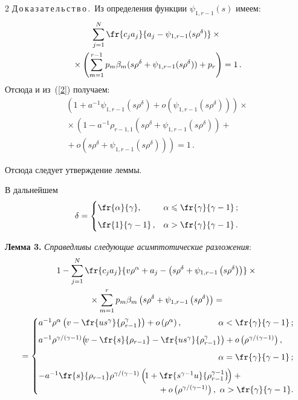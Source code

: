 \begin{multicols}{2}
\noindent
Д\,о\,к\,а\,з\,а\,т\,е\,л\,ь\,с\,т\,в\,о\,.\
Из определения функции $\psi_{1,r-1}(s)$ имеем:
\begin{multline*}
\sum\limits_{j=1}^N\fr{c_ja_j}{a_j-\psi_{1,r-1}(s\rho^{\delta})}\times{}\\
{}\times
\left(\sum\limits_{m=1}^{r-1}p_m\beta_m(s\rho^{\delta}+\psi_{1,r-1}(s\rho^{\delta}))+
p_r\right)=1\,.
\end{multline*}
Отсюда и из~(\ref{2}) получаем:
\begin{multline*}
\left(1+a^{-1}\psi_{1,r-1}\left(s\rho^{\delta}\right)+
o\left(\psi_{1,r-1}\left(s\rho^{\delta}\right)\right)\right)\times{}\\
{}\times\left(1-a^{-1}\rho_{r-1,1}\left(s\rho^{\delta}+\psi_{1,r-1}\left(s\rho^{\delta}\right)\right)
+{}\right.\\
\left.{}+o\left(s\rho^{\delta}+\psi_{1,r-1}\left(s\rho^{\delta}\right)\right)\right)=1\,.
\end{multline*}

Отсюда следует утверждение леммы.

В дальнейшем
$$
\delta=\begin{cases}
\fr{\alpha}{\gamma},&\alpha\leqslant \fr{\gamma}{\gamma-1}\,;\\[6pt]
\fr{1}{\gamma-1}\,,&\alpha> \fr{\gamma}{\gamma-1}\,.
\end{cases}
$$

\noindent
\textbf{Лемма 3.} \textit{Справедливы следующие асимптотические разложения}:
\begin{multline*}
1-\sum\limits_{j=1}^N\fr{c_ja_j}{v\rho^{\alpha}+
a_j-\left(s\rho^{\delta}+\psi_{1,r-1}\left(s\rho^{\delta}\right)\right)}\times{}\\
{}\times
\sum\limits_{m=1}^rp_m\beta_m\left(s\rho^{\delta}+\psi_{1,r-1}\left(s\rho^{\delta}\right)\right)={}\\
{}=\begin{cases}
a^{-1}\rho^{\alpha}\left(v-\fr{us^{\gamma}}{\rho_{r-1}^{\gamma}}\right)+
o\left(\rho^{\alpha}\right),&\hspace*{-30mm}\alpha<\fr{\gamma}{\gamma-1}\,;\\[6pt]
a^{-1}\rho^{{\gamma}/({\gamma-1})}\!\left(\!v-\fr{s}{\rho_{r-1}}-
\fr{us^{\gamma}}{\rho_{r-1}^{\gamma}}\right)+
o\left(\rho^{{\gamma}/({\gamma-1})}\right),&\hspace*{-18.81908pt}\\[6pt]
&\hspace*{-30mm}\alpha=\fr{\gamma}{\gamma-1}\,;\\[6pt]
-a^{-1}\fr{s}{\rho_{r-1}}\rho^{{\gamma}/({\gamma-1})}\left(\!1+
\fr{s^{\gamma-1}u}{\rho_{r-1}^{\gamma-1}}\!\right)+{}\\
&\hspace*{-55mm}{}+o\left(\rho^{{\gamma}/({\gamma-1})}\right),\ \alpha>\fr{\gamma}{\gamma-1}.
\end{cases}
\end{multline*}



\end{multicols}
